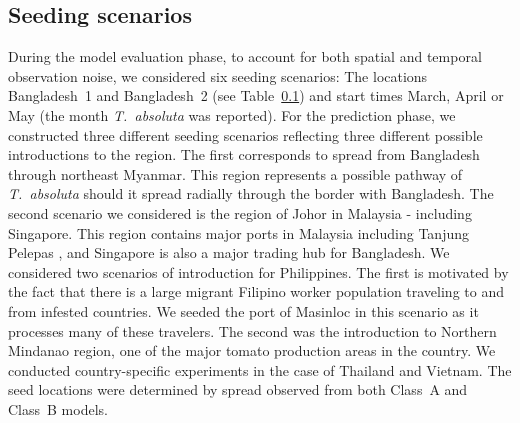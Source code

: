 \documentclass[10pt]{article}
\theoremstyle{definition}
\newcommand{\tuta}{\emph{T.~absoluta}}
\begin{document}
\subsection{Seeding scenarios}
\label{tab:seeds}
During the model evaluation phase, to account for both spatial and temporal
observation noise, we considered six seeding scenarios: The locations
Bangladesh~1 and Bangladesh~2 (see Table~\ref{tab:seeds}) and start times
March, April or May (the month \tuta{} was reported).  For the prediction
phase, we constructed three different seeding scenarios reflecting three
different possible introductions to the region. The first corresponds to
spread from Bangladesh through northeast Myanmar. This region represents a
possible pathway of \tuta{} should it spread radially through the border
with Bangladesh. The second scenario we considered is the region of Johor
in Malaysia - including Singapore. This region contains major ports in
Malaysia including Tanjung Pelepas \cite{khalid2005}, and Singapore is also
a major trading hub for Bangladesh. We considered two scenarios of
introduction for Philippines. The first is motivated by the fact that there
is a large migrant Filipino worker population traveling to and from
infested countries. We seeded the port of Masinloc in this scenario as it
processes many of these travelers. The second was the introduction to
Northern Mindanao region, one of the major tomato production areas in the
country. We conducted country-specific experiments in the case of Thailand
and Vietnam. The seed locations were determined by spread observed from
both Class~A and Class~B models.
\end{document}
